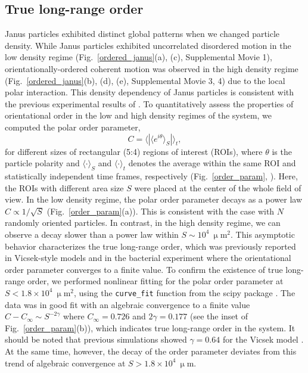 \documentclass[%
 reprint,
 amsmath,amssymb,
 aps,
 floatfix
]{revtex4-2}
\newcommand{\porder}{\langle\left|\langle e^{i\theta}\rangle_S\right|\rangle_t}
\begin{document}
\subsection{True long-range order}
Janus particles exhibited distinct global patterns when we changed particle density.
While Janus particles exhibited uncorrelated disordered motion in the low density regime (Fig.~\ref{ordered_janus}(a), (c), Supplemental Movie 1), orientationally-ordered coherent motion was observed in the high density regime (Fig.~\ref{ordered_janus}(b), (d), (e), Supplemental Movie 3, 4) due to the local polar interaction. This density dependency of Janus particles is consistent with the previous experimental results of \cite{granick2016}. 
To quantitatively assess the properties of orientational order in the low and high density regimes of the system, we computed the polar order parameter,
\begin{equation}
    C = \porder,
\end{equation}
for different sizes of rectangular (5:4) regions of interest (ROIs), where $\theta$ is the particle polarity and $\langle\cdot\rangle_S$ and $\langle\cdot\rangle_t$ denotes the average within the same ROI and statistically independent time frames, respectively (Fig.~\ref{order_param}, \cite{supplement}).
Here, the ROIs with different area size $S$ were placed at the center of the whole field of view.
In the low density regime, the polar order parameter decays as a power law $C\propto 1/\sqrt{S}$ (Fig.~\ref{order_param}(a)). 
This is consistent with the case with $N$ randomly oriented particles. 
In contrast, in the high density regime, we can observe a decay slower than a power law within $S \sim 10^4\ \upmu$m$^2$. 
This asymptotic behavior characterizes the true long-range order, which was previously reported in Vicsek-style models \cite{chate2020} and in the bacterial experiment \cite{nishiguchi2017} where the orientational order parameter converges to a finite value. 
To confirm the existence of true long-range order, we performed nonlinear fitting for the polar order parameter at $S<1.8\times10^4\ \upmu\textrm{m}^2$, using the \texttt{curve\_fit} function from the scipy package \cite{scipy}. 
The data was in good fit with an algebraic convergence to a finite value $C-C_\infty \sim S^{-2\gamma}$ where $C_\infty = 0.726$ and $2\gamma = 0.177$ (see the inset of Fig.~\ref{order_param}(b)), which indicates true long-range order in the system.
It should be noted that previous simulations showed $\gamma =0.64$ for the Vicsek model \cite{chate2020}.
At the same time, however, the decay of the order parameter deviates from this trend of algebraic convergence at $S>1.8\times10^4\ \upmu\textrm{m}$. 
\end{document}
